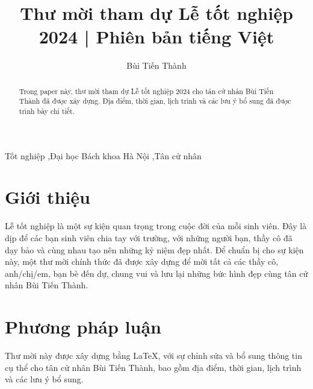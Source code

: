 \documentclass[final,5p,times,twocolumn, 8pt, a4paper]{elsarticle}
\begin{document}
    \begin{frontmatter}

        


        \title{Thư mời tham dự Lễ tốt nghiệp 2024 | Phiên bản tiếng Việt}

        \author[1]{Bùi Tiến Thành}







        \begin{abstract}
            Trong paper này, thư mời tham dự Lễ tốt nghiệp 2024 cho tân cử nhân Bùi Tiến Thành đã được xây dựng. Địa điểm, thời gian, lịch trình và các lưu ý bổ sung đã được trình bày chi tiết. 

        \end{abstract}

        \begin{keyword}
            Tốt nghiệp \sep Đại học Bách khoa Hà Nội \sep Tân cử nhân
        \end{keyword}

    \end{frontmatter}


    \section{Giới thiệu}
        \par Lễ tốt nghiệp là một sự kiện quan trọng trong cuộc đời của mỗi sinh viên. Đây là dịp để các bạn sinh viên chia tay với trường, với những người bạn, thầy cô đã dạy bảo và cùng nhau tạo nên những kỷ niệm đẹp nhất. Để chuẩn bị cho sự kiện này, một thư mời chính thức đã được xây dựng để mời tất cả các thầy cô, anh/chị/em, bạn bè đến dự, chung vui và lưu lại những bức hình đẹp cùng tân cử nhân Bùi Tiến Thành.


    \section{Phương pháp luận}
        \par Thư mời này được xây dựng bằng LaTeX, với sự chỉnh sửa và bổ sung thông tin cụ thể cho tân cử nhân Bùi Tiến Thành, bao gồm địa điểm, thời gian, lịch trình và các lưu ý bổ sung.
\end{document}

